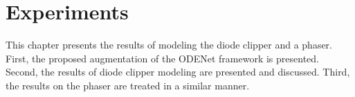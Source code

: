 \chapter{Experiments}
\label{chapter:experiments}

This chapter presents the results of modeling the diode clipper and a phaser. First, the proposed augmentation of the ODENet framework is presented. Second, the results of diode clipper modeling are presented and discussed. Third, the results on the phaser are treated in a similar manner.




